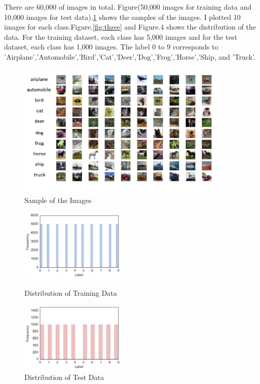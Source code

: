 \documentclass[a4paper,10pt,fleqn]{article}
\begin{document}
There are 60,000 of images in total. Figure(50,000 images for training data and 10,000 images for test data).\ref{fig:two} shows the samples of the images. I plotted 10 images for each class.Figure.\ref{fig:three} and Figure.4 shows the distribution of the data. For the training dataset, each class has 5,000 images and for the test dataset, each class has 1,000 images.
The label 0 to 9 corresponds to 'Airplane','Automobile','Bird','Cat','Deer','Dog','Frog','Horse','Ship, and 'Truck'.
\begin{figure}[htbp]

\begin{center}
\includegraphics[width=10cm]{picture/random_sample.png}
\end{center}
\caption{Sample of the Images}
\label{fig:two}

\end{figure}

\begin{figure}[h]
\begin{minipage}{0.5\hsize}
	\begin{center}
	\includegraphics[width=5cm]{picture/Distribution_of_Training_Data.png}
	\end{center}
	\caption{Distribution of Training Data}
	\label{fig:three}
\end{minipage}
\begin{minipage}{0.5\hsize}
\begin{center}
\includegraphics[width=5cm]{picture/Distribution_of_Test_Data.png}
\end{center}
 \caption{Distribution of Test Data}
  \label{fig:four}
 \end{minipage}
\end{figure}
\end{document}
